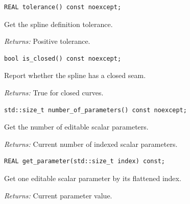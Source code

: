 \par\noindent\begin{minipage}{\linewidth}
\begin{lstlisting}[style=apireference]
REAL tolerance() const noexcept;
\end{lstlisting}
{\footnotesize Get the spline definition tolerance.\par}
{\footnotesize\textit{Returns:} Positive tolerance.\par}
\end{minipage}\par\vspace{1pt}
\par\noindent\begin{minipage}{\linewidth}
\begin{lstlisting}[style=apireference]
bool is_closed() const noexcept;
\end{lstlisting}
{\footnotesize Report whether the spline has a closed seam.\par}
{\footnotesize\textit{Returns:} True for closed curves.\par}
\end{minipage}\par\vspace{1pt}
\par\noindent\begin{minipage}{\linewidth}
\begin{lstlisting}[style=apireference]
std::size_t number_of_parameters() const noexcept;
\end{lstlisting}
{\footnotesize Get the number of editable scalar parameters.\par}
{\footnotesize\textit{Returns:} Current number of indexed scalar parameters.\par}
\end{minipage}\par\vspace{1pt}
\par\noindent\begin{minipage}{\linewidth}
\begin{lstlisting}[style=apireference]
REAL get_parameter(std::size_t index) const;
\end{lstlisting}
{\footnotesize Get one editable scalar parameter by its flattened index.\par}
{\footnotesize\textit{Returns:} Current parameter value.\par}
\end{minipage}\par\vspace{1pt}
